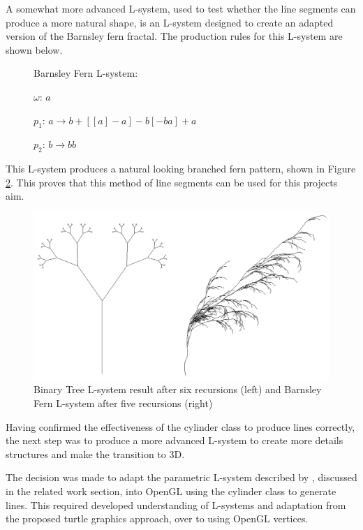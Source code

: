 \documentclass[final]{cmpreport}
\begin{document}
A somewhat more advanced L-system, used to test whether the line segments can produce a more natural 
shape, is an L-system designed to create an adapted version of the Barnsley fern fractal. The 
production rules for this L-system are shown below.

\begin{figure}[ht]
    Barnsley Fern L-system:

    $\omega$: $a$ 

    $p_1$: $a \rightarrow b+[[a]-a]-b[-ba]+a$

    $p_2$: $b \rightarrow bb$
    \label{fig:b-fern-string-system}
\end{figure}

This L-system produces a natural looking branched fern pattern, shown in Figure \ref{fig:b-tree-fern-string}. 
This proves that this method of line segments can be used for this projects aim.

\begin{figure}[ht]
    \includegraphics[scale=0.4]{b-tree-fern-string.png} 
    \centering
    \captionsetup{justification=centering}
    \caption{Binary Tree L-system result after six recursions (left) and Barnsley Fern L-system
             after five recursions (right)}
    \label{fig:b-tree-fern-string}
\end{figure}

Having confirmed the effectiveness of the cylinder class to produce lines correctly, the next 
step was to produce a more advanced L-system to create more details structures and make the 
transition to 3D. 

The decision was made to adapt the parametric L-system described by \cite{prusinkiewicz1996systems}, 
discussed in the related work section, into OpenGL using the cylinder class to generate lines. 
This required developed understanding of L-systems and adaptation from the proposed turtle graphics
approach, over to using OpenGL vertices.
\end{document}
